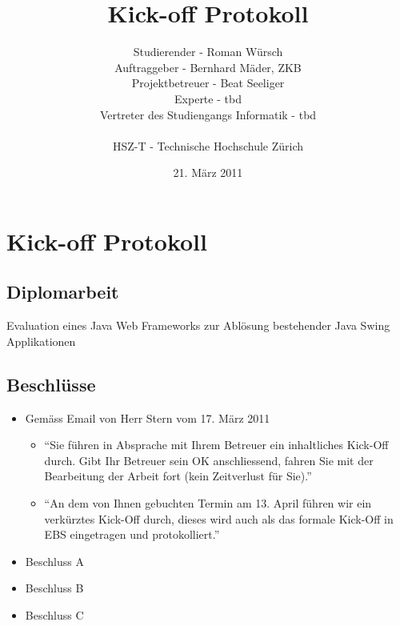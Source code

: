 \documentclass[listof=totoc,bibliography=totoc]{scrreprt}
\title{Kick-off Protokoll}
\author{Studierender - Roman Würsch\\
	Auftraggeber - Bernhard Mäder, ZKB\\
    Projektbetreuer - Beat Seeliger\\
    Experte - tbd\\
    Vertreter des Studiengangs Informatik - tbd\\
    \\
    HSZ-T - Technische Hochschule Zürich}
\date{21. März 2011}
\begin{document}
    \ifpdf
    \else
    \fi

    \maketitle



    \chapter{Kick-off Protokoll}

    \section{Diplomarbeit}
    Evaluation eines Java Web Frameworks zur Ablösung bestehender Java Swing
    Applikationen

    \section{Beschlüsse}
    \begin{itemize}
        \item Gemäss Email von Herr Stern vom 17. März 2011
        \begin{itemize}
          \item ``Sie führen in Absprache mit Ihrem Betreuer ein inhaltliches
          Kick-Off durch. Gibt Ihr Betreuer sein OK anschliessend, fahren Sie
          mit der Bearbeitung der Arbeit fort (kein Zeitverlust für Sie).''
          \item ``An dem von Ihnen gebuchten Termin am 13. April führen wir
          ein verkürztes Kick-Off durch, dieses wird auch als das formale
          Kick-Off in EBS eingetragen und protokolliert.''
        \end{itemize} 
        \item Beschluss A
        \item Beschluss B
        \item Beschluss C
    \end{itemize}
    
\end{document}
